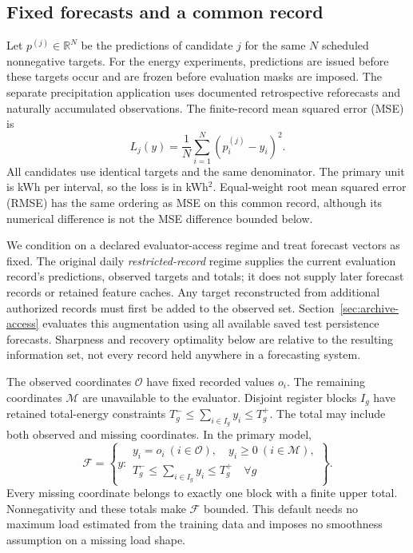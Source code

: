 \documentclass[12pt]{article}
\newcommand{\F}{\mathcal{F}}
\newcommand{\R}{\mathbb{R}}
\newcommand{\M}{\mathcal{M}}
\newcommand{\Oset}{\mathcal{O}}
\begin{document}
\subsection{Fixed forecasts and a common record}
Let $p^{(j)}\in\R^N$ be the predictions of candidate $j$ for the same $N$
scheduled nonnegative targets. For the energy experiments, predictions are
issued before these targets occur and are frozen before evaluation masks
are imposed. The separate precipitation application uses documented
retrospective reforecasts and naturally accumulated observations. The
finite-record mean squared error (MSE) is
\begin{equation}
 L_j(y)=\frac{1}{N}\sum_{i=1}^N(p_i^{(j)}-y_i)^2.
 \label{eq:loss}
\end{equation}
All candidates use identical targets and the same denominator. The primary
unit is kWh per interval, so the loss is in kWh$^2$. Equal-weight root mean
squared error (RMSE) has
the same ordering as MSE on this common record, although its numerical
difference is not the MSE difference bounded below.

We condition on a declared evaluator-access regime and treat forecast
vectors as fixed. The original daily \emph{restricted-record} regime supplies
the current evaluation record's predictions, observed targets and totals;
it does not supply later forecast records or retained feature caches.
Any target reconstructed from additional authorized records must first be
added to the observed set. Section~\ref{sec:archive-access} evaluates this
augmentation using all available saved test persistence forecasts.
Sharpness and recovery optimality below are relative to the resulting
information set, not every record held anywhere in a forecasting system.

The observed coordinates $\Oset$ have fixed recorded values $o_i$.
The remaining coordinates $\M$ are unavailable to the evaluator.
Disjoint register blocks $I_g$ have retained total-energy constraints
$T_g^-\leq\sum_{i\in I_g}y_i\leq T_g^+$. The total may include both
observed and missing coordinates. In the primary model,
\begin{equation}
 \F=\left\{y:\begin{array}{l}
 y_i=o_i\ (i\in\Oset),\quad y_i\geq0\ (i\in\M),\\
 T_g^-\leq\sum_{i\in I_g}y_i\leq T_g^+\quad\forall g
 \end{array}\right\}.
 \label{eq:feasible}
\end{equation}
Every missing coordinate belongs to exactly one block with a finite upper
total. Nonnegativity and these totals make $\F$ bounded. This default needs
no maximum load estimated from the training data and imposes no smoothness
assumption on a missing load shape.
\end{document}
